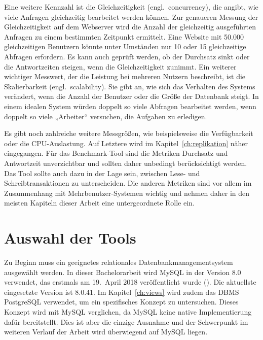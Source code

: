 Eine weitere Kennzahl ist die Gleichzeitigkeit (engl.\ concurrency), die angibt, wie viele Anfragen gleichzeitig bearbeitet werden können.
Zur genaueren Messung der Gleichzeitigkeit auf dem Webserver wird die Anzahl der gleichzeitig ausgeführten Anfragen zu einem bestimmten Zeitpunkt ermittelt.
Eine Website mit 50.000 gleichzeitigen Benutzern könnte unter Umständen nur 10 oder 15 gleichzeitige Abfragen erfordern.
Es kann auch geprüft werden, ob der Durchsatz sinkt oder die Antwortzeiten steigen, wenn die Gleichzeitigkeit zunimmt.
Ein weiterer wichtiger Messwert, der die Leistung bei mehreren Nutzern beschreibt, ist die Skalierbarkeit (engl.\ scalability).
Sie gibt an, wie sich das Verhalten des Systems verändert, wenn die Anzahl der Benutzer oder die Größe der Datenbank steigt.
In einem idealen System würden doppelt so viele Abfragen bearbeitet werden, wenn doppelt so viele „Arbeiter“ versuchen, die Aufgaben zu erledigen.

Es gibt noch zahlreiche weitere Messgrößen, wie beispielsweise die Verfügbarkeit oder die CPU-Auslastung.
Auf Letztere wird im Kapitel~\ref{ch:replikation} näher eingegangen.
Für das Benchmark-Tool sind die Metriken Durchsatz und Antwortzeit unverzichtbar und sollten daher unbedingt berücksichtigt werden.
Das Tool sollte auch dazu in der Lage sein, zwischen Lese- und Schreibtransaktionen zu unterscheiden.
Die anderen Metriken sind vor allem im Zusammenhang mit Mehrbenutzer-Systemen wichtig und nehmen daher in den meisten Kapiteln dieser Arbeit eine untergeordnete Rolle ein.

\section{Auswahl der Tools}\label{sec:auswahl-der-tools}

Zu Beginn muss ein geeignetes relationales Datenbankmanagementsystem ausgewählt werden.
In dieser Bachelorarbeit wird MySQL in der Version 8.0 verwendet, das erstmals am 19.\ April 2018 veröffentlicht wurde (\cite{mysql_release}).
Die aktuellste eingesetzte Version ist 8.0.41.
Im Kapitel~\ref{ch:views} wird zudem das DBMS PostgreSQL verwendet, um ein spezifisches Konzept zu untersuchen.
Dieses Konzept wird mit MySQL verglichen, da MySQL keine native Implementierung dafür bereitstellt.
Dies ist aber die einzige Ausnahme und der Schwerpunkt im weiteren Verlauf der Arbeit wird überwiegend auf MySQL liegen.


